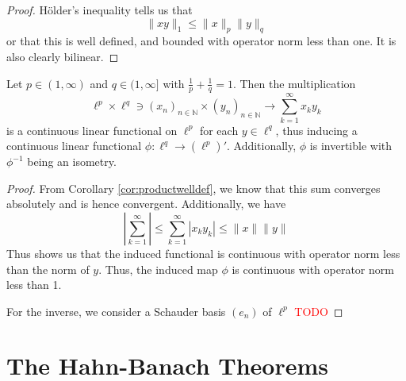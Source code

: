 \documentclass[twoside,symmetric, openany, 12pt]{./tuftebook}
\theoremstyle{definition}
\theoremstyle{definition}
\theoremstyle{definition}
\newcommand{\N}{\mathbb{N}}
\begin{document}
\begin{proof}
Hölder's inequality tells us that
\[\|xy\|_1 \le \|x\|_p \|y\|_q\]
or that this is well defined, and bounded with operator norm less than one. It is also clearly bilinear.
\end{proof}
\begin{Example}[$(\ell^p)' =\ell^q$]
	Let $p\in (1,\infty)$ and $q\in (1,\infty]$ with $\frac 1p + \frac 1q = 1$. Then the multiplication
	\[\ell^p \times \ell^q \ni (x_n)_{n\in \N} \times (y_n)_{n\in \N} \to \sum_{k=1}^\infty x_k y_k\]
	is a continuous linear functional on $\ell^p$ for each $y\in \ell^q$, thus inducing a continuous linear functional $\phi:\ell^q \to (\ell^p)'$. Additionally, $\phi$ is invertible with $\phi^{-1}$ being an isometry.
\end{Example}
\begin{proof}
	From Corollary \ref{cor:productwelldef}, we know that this sum converges absolutely and is hence convergent. Additionally, we have
	\[\left| \sum_{k=1}^\infty \right| \le \sum_{k=1}^\infty |x_k y_k| \le \|x\|\|y\|\]
	Thus shows us that the induced functional is continuous with operator norm less than the norm of $y$. Thus, the induced map $\phi$ is continuous with operator norm less than 1.
	
	For the inverse, we consider a Schauder basis $(e_n)$ of $\ell^p$ \textcolor{red}{TODO}
\end{proof}
	\section{The Hahn-Banach Theorems}
\end{document}
